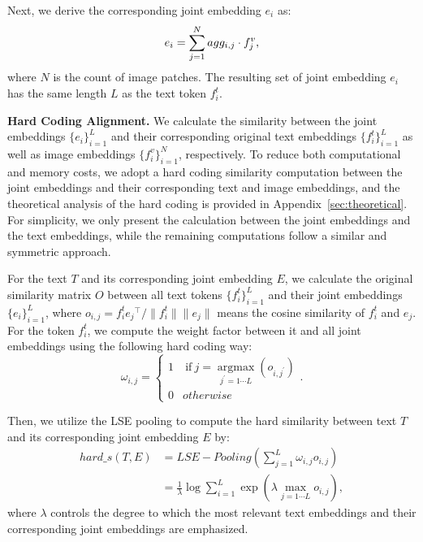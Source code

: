 \documentclass[acmsmall]{acmart}
\begin{document}
Next, we derive the corresponding joint embedding $e_i$ as:
\begin{equation}
    {e}_i=\sum_{j=1}^N\\agg_{i,j}\cdot{f}_j^v,
\end{equation}
where $N$ is the count of image patches. The resulting set of
joint embedding ${e}_i$ has the same length $L$ as
the text token $f_{i}^t$.

{\bfseries Hard Coding Alignment.} We calculate the similarity
between the joint embeddings $\{e_i\}_{i=1}^L$ and their
corresponding original text embeddings $\{f_i^t\}_{i=1}^L$ as well
as image embeddings $\{f_i^v\}_{i=1}^N$, respectively. To reduce
both computational and memory costs, we adopt a hard coding
similarity computation between the joint embeddings and their
corresponding text and image embeddings, and the theoretical
analysis of the hard coding is provided in
Appendix~\ref{sec:theoretical}. For simplicity, we only present the
calculation between the joint embeddings and the text embeddings,
while the remaining computations follow a similar and symmetric
approach.

For the text $T$ and its corresponding joint embedding $E$, we
calculate the original similarity matrix $O$ between all text tokens
$\{f_i^t\}_{i=1}^L$ and their joint embeddings $\{e_i\}_{i=1}^L$,
where $o_{i,j}={f_i^t}{e_j}^{\top}/\|f_i^t\|\|e_j\|$ means the
cosine similarity of $f_i^t$ and $e_j$. For the token $f_i^t$, we
compute the weight factor between it and all joint embeddings using
the following hard coding way:
\begin{equation}
    \omega_{i,j}=
\begin{cases}
1 & \mathrm{~if~}j=\underset{j^{\prime}=1\cdots L}{\operatorname*{argmax}}(o_{i,j^{\prime}}) \\
0 & otherwise
\end{cases}.
\label{eq:hardw}
\end{equation}

Then, we utilize the LSE pooling \cite{lee2018stacked} to compute
the hard similarity between text $T$ and its corresponding joint
embedding $E$ by:
\begin{equation}
\begin{split}
    hard\_s(T, E) &= LSE-Pooling\left(\sum_{j=1}^L\omega_{i,j}o_{i,j}\right) \\
    &= \frac{1}{\lambda} \log \sum_{i=1}^{L} \exp\left(\lambda\max_{j=1\cdots
    L}o_{i,j}\right),
    \label{eq:hard}
\end{split}
\end{equation}
where $\lambda$ controls the degree to which the most relevant text
embeddings and their corresponding joint embeddings are emphasized.
\end{document}

